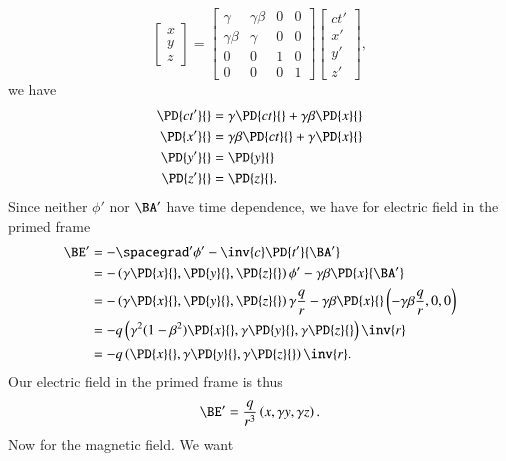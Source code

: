 {\begin{equation}
\begin{bmatrix}
x \\
y \\
z
\end{bmatrix}
=
\begin{bmatrix}
\gamma & \gamma \beta & 0 & 0 \\
\gamma \beta & \gamma & 0 & 0 \\
0 & 0 & 1 & 0 \\
0 & 0 & 0 & 1
\end{bmatrix}
\begin{bmatrix}
ct' \\
x' \\
y' \\
z'
\end{bmatrix},
\end{equation}
we have
\begin{equation}\label{eqn:relElectroDynProblemSet2:1050}
\begin{aligned}
\PD{c t'}{} &= \gamma \PD{ct}{} + \gamma \beta \PD{x}{} \\
\PD{x'}{} &= \gamma \beta \PD{ct}{} + \gamma \PD{x}{} \\
\PD{y'}{} &= \PD{y}{} \\
\PD{z'}{} &= \PD{z}{}.
\end{aligned}
\end{equation}
%
Since neither \(\phi'\) nor \(\BA'\) have time dependence, we have for electric field in the primed frame
%
\begin{equation}\label{eqn:relElectroDynProblemSet2:1250}
\begin{aligned}
\BE'
&= -\spacegrad' \phi' - \inv{c} \PD{t'}{\BA'} \\
&=
-\left( \gamma \PD{x}{}, \PD{y}{}, \PD{z}{} \right) \phi'
- \gamma \beta \PD{x}{\BA'} \\
&=
-\left( \gamma \PD{x}{}, \PD{y}{}, \PD{z}{} \right) \gamma \frac{q}{r}
- \gamma \beta \PD{x}{} \left( -\gamma \beta \frac{q}{r}, 0, 0 \right) \\
&= -q \left( \gamma^2 ( 1 - \beta^2 ) \PD{x}{}, \gamma \PD{y}{}, \gamma \PD{z}{} \right) \inv{r} \\
&= -q \left( \PD{x}{}, \gamma \PD{y}{}, \gamma \PD{z}{} \right) \inv{r}.
\end{aligned}
\end{equation}
Our electric field in the primed frame is thus
\begin{equation}\label{eqn:relElectroDynProblemSet2:1070}
\BE' = \frac{q}{r^3} \left( x, \gamma y, \gamma z \right).
\end{equation}
%
Now for the magnetic field.  We want
}
